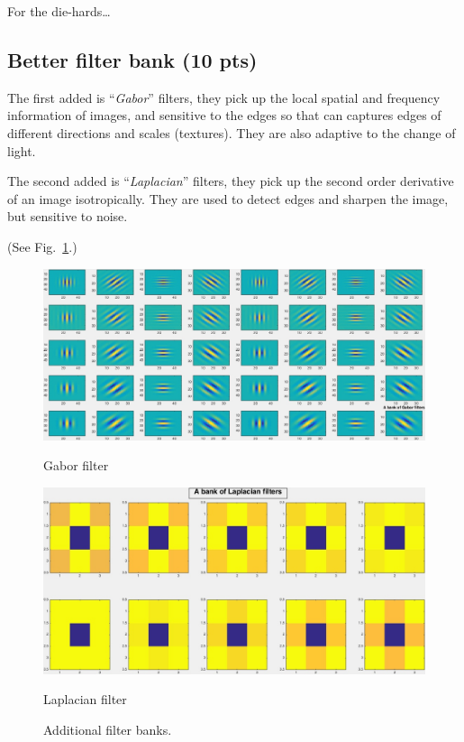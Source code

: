 \documentclass[12pt]{article}
\begin{document}
For the die-hards\ldots

\subsection{Better filter bank (10 pts)}
The first added is ``\emph{Gabor}'' filters, they pick up the local spatial and frequency information of images, and sensitive to the edges so that can captures edges of different directions and scales (textures). They are also adaptive to the change of light.

 The second added is ``\emph{Laplacian}'' filters, they pick up the second order derivative of an image isotropically. They are used to detect edges and sharpen the image, but sensitive to noise.

 (See Fig.~\ref{fig:filter_bank}.)

\begin{figure}
\centering
  \begin{minipage}[t]{0.8 \textwidth}
    \centering \includegraphics[width= \linewidth]{./figures/gaborBank} 
    \caption*{Gabor filter}
  \end{minipage}
  \begin{minipage}[t]{0.8 \textwidth}
    \centering \includegraphics[width= \linewidth]{./figures/laplacianBank}
    \caption*{Laplacian filter}
  \end{minipage}
\caption{Additional filter banks.}
\label{fig:filter_bank}
\end{figure}
\end{document}
